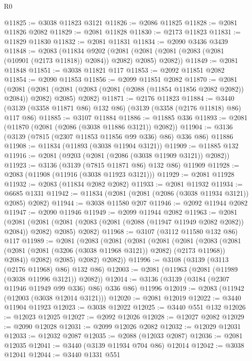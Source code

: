 \begin{lexlean}{R0}
\begin{coremodule}
@11825 := @3038 @11823 @3121
@11826 := @2086 @11825
@11828 := @2081 @11826 @2082
@11829 := @2081 @11828
@11830 := @2173 @11823
@11831 := @11829 @11830
@11832 := @2081 @11831
@11834 := @2090 @3436 @3439
@11848 := @2083
    (@11834
      @9202
      (@2081 (@2081 (@2081 (@2083 (@2081 (@10901 (@2173 @11818)) @2084)) @2082) @2085) @2082))
@11849 := @2081 @11848
@11851 := @3038 @11821 @117
@11853 := @2092 @11851 @2082
@11854 := @2090 @11853
@11856 := @2099 @11851 @2082
@11870 := @2081
    (@2081
      (@2081 (@2081 (@2083 (@2081 (@2088 (@11854 @11856 @2082 @2082)) @2084)) @2082) @2085)
      @2082)
@11871 := @2176 @11823
@11884 := @3440 (@3139 (@3358 @11871 @86) @132 @86) (@3139 (@3358 (@2176 @11818) @86) @117 @86)
@11885 := @3107 @11884
@11886 := @11885 @336
@11893 := @2081 (@11870 (@2081 (@2086 (@3038 @11886 @3121)) @2082))
@11904 := @3136 (@3139 (@7815 (@2307 @11853 @11856 @99 @336) @86) @336 @86) @11886
@11908 := @11834 (@11893 (@3038 @11904 @3121))
@11909 := @11885 @132
@11916 := @2081 (@9203 (@2081 (@2086 (@3038 @11909 @3121)) @2082))
@11923 := @3136 (@3139 (@7815 @11871 @86) @132 @86) @11909
@11928 := @2083 (@11908 (@11916 (@3038 @11923 @3121)))
@11929 := @2081 @11928
@11932 := @2083 (@11834 @2082 @2082)
@11933 := @2081 @11932
@11934 := @6685 @1331
@11942 := @11834 (@2081 (@2081 (@2086 (@3038 @11934 @3121)) @2085) @2082)
@11944 := @3038 @11580 @207
@11946 := @2092 @11944 @2082
@11947 := @2090 @11946
@11949 := @2099 @11944 @2082
@11963 := @2081
    (@2081
      (@2081 (@2081 (@2083 (@2081 (@2088 (@11947 @11949 @2082 @2082)) @2084)) @2082) @2085)
      @2082)
@11968 := @3107 (@3112 @11580 @132 @86) @117
@11989 := @2081
    (@2083
      (@2081
        (@2081
          (@2081
            (@2081
              (@2083
                (@2081 (@2081 (@2081 (@3206 (@3038 @11968 @3121)) @2082) (@2173 @11968)) @2084))
              @2082)
            @2085)
          @2082)
        @2082))
@11996 := @3108 (@3139 (@3113 (@2176 @11968) @86) @132 @86)
@12003 := @2081 (@11963 (@2081 (@11989 (@3038 @11996 @3121)) @2082))
@12014 := @3136 (@3139 (@3184 (@2307 @11946 @11949 @99 @336) @86) @336 @86) @11996
@12019 := @2083 (@11942 (@12003 (@3038 @12014 @3121)))
@12020 := @2081 @12019
@12022 := @3440 @11904 @11923
@12023 := @3038 @12022
@12025 := @3440 @551 @132
@12026 := @12023 @12025
@12027 := @2092 @12026
@12028 := @12027 @2082
@12029 := @2090 @12028
@12031 := @2099 @12026 @2082
@12032 := @12029 @12031
@12033 := @12032 @2087
@12035 := @2088 (@12033 @2087)
@12036 := @2081 @12035
@12041 := @3440 (@3139 @11934 @704 @86) @12014
@12042 := @3038 @12041
@12044 := @3440 @1331 @551

\end{coremodule}
\end{lexlean}
